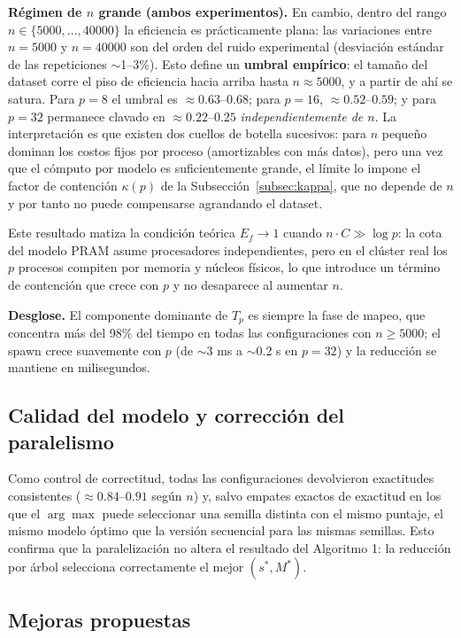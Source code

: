 \documentclass[11pt, a4paper]{article}
\begin{document}
\textbf{Régimen de $n$ grande (ambos experimentos).} En cambio, dentro del rango $n \in \{5000, \dots, 40000\}$ la eficiencia es prácticamente plana: las variaciones entre $n = 5000$ y $n = 40000$ son del orden del ruido experimental (desviación estándar de las repeticiones $\sim$1--3\%). Esto define un \textbf{umbral empírico}: el tamaño del dataset corre el piso de eficiencia hacia arriba hasta $n \approx 5000$, y a partir de ahí se satura. Para $p = 8$ el umbral es $\approx 0.63$--$0.68$; para $p = 16$, $\approx 0.52$--$0.59$; y para $p = 32$ permanece clavado en $\approx 0.22$--$0.25$ \emph{independientemente de $n$}. La interpretación es que existen dos cuellos de botella sucesivos: para $n$ pequeño dominan los costos fijos por proceso (amortizables con más datos), pero una vez que el cómputo por modelo es suficientemente grande, el límite lo impone el factor de contención $\kappa(p)$ de la Subsección~\ref{subsec:kappa}, que no depende de $n$ y por tanto no puede compensarse agrandando el dataset.

Este resultado matiza la condición teórica $E_f \to 1$ cuando $n \cdot C \gg \log p$: la cota del modelo PRAM asume procesadores independientes, pero en el clúster real los $p$ procesos compiten por memoria y núcleos físicos, lo que introduce un término de contención que crece con $p$ y no desaparece al aumentar $n$.

\textbf{Desglose.} El componente dominante de $T_p$ es siempre la fase de mapeo, que concentra más del 98\% del tiempo en todas las configuraciones con $n \ge 5000$; el spawn crece suavemente con $p$ (de $\sim$3 ms a $\sim$0.2 s en $p=32$) y la reducción se mantiene en milisegundos.

\subsection{Calidad del modelo y corrección del paralelismo}

Como control de correctitud, todas las configuraciones devolvieron exactitudes consistentes ($\approx 0.84$--$0.91$ según $n$) y, salvo empates exactos de exactitud en los que el $\arg\max$ puede seleccionar una semilla distinta con el mismo puntaje, el mismo modelo óptimo que la versión secuencial para las mismas semillas. Esto confirma que la paralelización no altera el resultado del Algoritmo 1: la reducción por árbol selecciona correctamente el mejor $(s^*, M^*)$.

\subsection{Mejoras propuestas}
\end{document}
